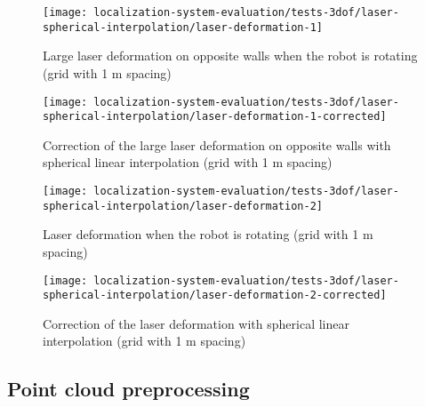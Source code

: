 \begin{figure}[H]
	\centering
	\texttt{[image: localization-system-evaluation/tests-3dof/laser-spherical-interpolation/laser-deformation-1]}
	\caption{Large laser deformation on opposite walls when the robot is rotating (grid with 1 m spacing)}
	\label{fig:localization-system-evaluation_laser-deformation-1}
\end{figure}

\begin{figure}[H]
	\centering
	\texttt{[image: localization-system-evaluation/tests-3dof/laser-spherical-interpolation/laser-deformation-1-corrected]}
	\caption{Correction of the large laser deformation on opposite walls with spherical linear interpolation (grid with 1 m spacing)}
	\label{fig:localization-system-evaluation_laser-deformation-1-corrected}
\end{figure}


\begin{figure}[H]
	\centering
	\texttt{[image: localization-system-evaluation/tests-3dof/laser-spherical-interpolation/laser-deformation-2]}
	\caption{Laser deformation when the robot is rotating (grid with 1 m spacing)}
	\label{fig:localization-system-evaluation_laser-deformation-2}
\end{figure}

\begin{figure}[H]
	\centering
	\texttt{[image: localization-system-evaluation/tests-3dof/laser-spherical-interpolation/laser-deformation-2-corrected]}
	\caption{Correction of the laser deformation with spherical linear interpolation (grid with 1 m spacing)}
	\label{fig:localization-system-evaluation_laser-deformation-2-corrected}
\end{figure}



\subsection{Point cloud preprocessing}

